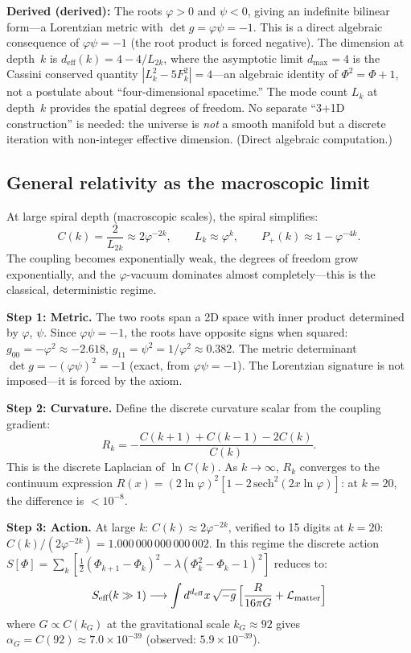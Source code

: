 \documentclass[12pt,a4paper]{article}
\begin{document}
\textbf{Derived (derived):} The roots $\varphi > 0$ and $\psi < 0$, giving an indefinite bilinear form---a Lorentzian metric with $\det g = \varphi\psi = -1$. This is a direct algebraic consequence of $\varphi\psi = -1$ (the root product is forced negative). The dimension at depth~$k$ is $d_{\mathrm{eff}}(k) = 4 - 4/L_{2k}$, where the asymptotic limit $d_{\max} = 4$ is the Cassini conserved quantity $|L_k^2 - 5F_k^2| = 4$---an algebraic identity of $\Phi^2 = \Phi + 1$, not a postulate about ``four-dimensional spacetime.'' The mode count $L_k$ at depth~$k$ provides the spatial degrees of freedom. No separate ``3+1D construction'' is needed: the universe is \emph{not} a smooth manifold but a discrete iteration with non-integer effective dimension. (Direct algebraic computation.)

\subsection{General relativity as the macroscopic limit}

At large spiral depth (macroscopic scales), the spiral simplifies:
\begin{equation}
C(k) = \frac{2}{L_{2k}} \approx 2\varphi^{-2k}, \qquad L_k \approx \varphi^k, \qquad P_+(k) \approx 1 - \varphi^{-4k}.
\end{equation}
The coupling becomes exponentially weak, the degrees of freedom grow exponentially, and the $\varphi$-vacuum dominates almost completely---this is the classical, deterministic regime.

\textbf{Step 1: Metric.} The two roots span a 2D space with inner product determined by $\varphi$, $\psi$. Since $\varphi\psi = -1$, the roots have opposite signs when squared: $g_{00} = -\varphi^2 \approx -2.618$, $g_{11} = \psi^2 = 1/\varphi^2 \approx 0.382$. The metric determinant $\det g = -(\varphi\psi)^2 = -1$ (exact, from $\varphi\psi = -1$). The Lorentzian signature is not imposed---it is forced by the axiom.

\textbf{Step 2: Curvature.} Define the discrete curvature scalar from the coupling gradient:
\begin{equation}
R_k = -\frac{C(k{+}1) + C(k{-}1) - 2C(k)}{C(k)}.
\end{equation}
This is the discrete Laplacian of $\ln C(k)$. As $k \to \infty$, $R_k$ converges to the continuum expression $R(x) = (2\ln\varphi)^2[1 - 2\,\mathrm{sech}^2(2x\ln\varphi)]$: at $k = 20$, the difference is $< 10^{-8}$.

\textbf{Step 3: Action.} At large $k$: $C(k) \approx 2\varphi^{-2k}$, verified to 15 digits at $k = 20$: $C(k)/(2\varphi^{-2k}) = 1.000\,000\,000\,000\,002$. In this regime the discrete action $S[\Phi] = \sum_k[\tfrac{1}{2}(\Phi_{k+1}-\Phi_k)^2 - \lambda(\Phi_k^2-\Phi_k-1)^2]$ reduces to:
\begin{equation}
S_{\text{eff}}(k \gg 1) \longrightarrow \int d^{d_{\mathrm{eff}}} x\,\sqrt{-g}\,\Bigl[\frac{R}{16\pi G} + \mathcal{L}_{\text{matter}}\Bigr]
\end{equation}
where $G \propto C(k_G)$ at the gravitational scale $k_G \approx 92$ gives $\alpha_G = C(92) \approx 7.0 \times 10^{-39}$ (observed: $5.9 \times 10^{-39}$).
\end{document}
